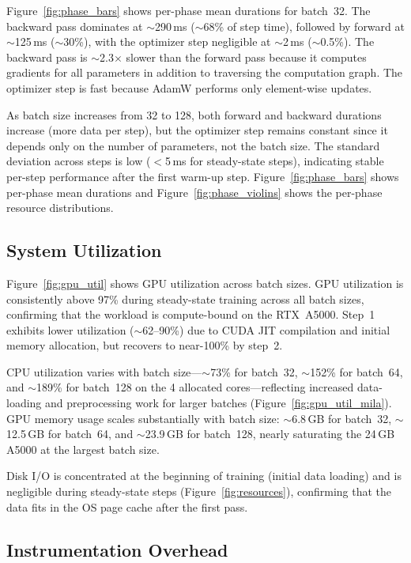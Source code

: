 \documentclass[10pt,twocolumn]{article}
\begin{document}
Figure~\ref{fig:phase_bars} shows per-phase mean durations for batch~32. The backward pass dominates at $\sim$290\,ms ($\sim$68\% of step time), followed by forward at $\sim$125\,ms ($\sim$30\%), with the optimizer step negligible at $\sim$2\,ms ($\sim$0.5\%). The backward pass is $\sim$2.3$\times$ slower than the forward pass because it computes gradients for all parameters in addition to traversing the computation graph. The optimizer step is fast because AdamW performs only element-wise updates.

As batch size increases from 32 to 128, both forward and backward durations increase (more data per step), but the optimizer step remains constant since it depends only on the number of parameters, not the batch size. The standard deviation across steps is low ($<$5\,ms for steady-state steps), indicating stable per-step performance after the first warm-up step. Figure~\ref{fig:phase_bars} shows per-phase mean durations and Figure~\ref{fig:phase_violins} shows the per-phase resource distributions.

\subsection{System Utilization}

Figure~\ref{fig:gpu_util} shows GPU utilization across batch sizes. GPU utilization is consistently above 97\% during steady-state training across all batch sizes, confirming that the workload is compute-bound on the RTX~A5000. Step~1 exhibits lower utilization ($\sim$62--90\%) due to CUDA JIT compilation and initial memory allocation, but recovers to near-100\% by step~2.

CPU utilization varies with batch size---$\sim$73\% for batch~32, $\sim$152\% for batch~64, and $\sim$189\% for batch~128 on the 4 allocated cores---reflecting increased data-loading and preprocessing work for larger batches (Figure~\ref{fig:gpu_util_mila}). GPU memory usage scales substantially with batch size: $\sim$6.8\,GB for batch~32, $\sim$12.5\,GB for batch~64, and $\sim$23.9\,GB for batch~128, nearly saturating the 24\,GB A5000 at the largest batch size.

Disk I/O is concentrated at the beginning of training (initial data loading) and is negligible during steady-state steps (Figure~\ref{fig:resources}), confirming that the data fits in the OS page cache after the first pass.

\subsection{Instrumentation Overhead}
\end{document}
